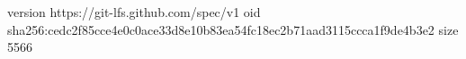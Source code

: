 version https://git-lfs.github.com/spec/v1
oid sha256:cedc2f85cce4e0c0ace33d8e10b83ea54fc18ec2b71aad3115ccca1f9de4b3e2
size 5566
